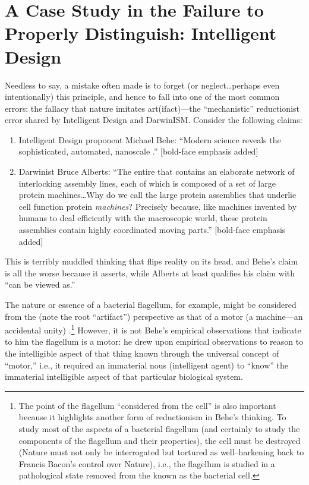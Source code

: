 \section{A Case Study in the Failure to Properly Distinguish: Intelligent Design}

Needless to say, a mistake often made is to forget (or neglect\ldots perhaps even intentionally) this principle, and hence to fall into one of the most common errors: the fallacy that nature imitates art(ifact)---the ``mechanistic'' reductionist error shared by Intelligent Design and DarwinISM. Consider the following claims:

\begin{enumerate}
\item Intelligent Design proponent Michael Behe: ``Modern science reveals the  sophisticated, automated, nanoscale .''\cite{beheinterview} [bold-face emphasis added]
\item Darwinist Bruce Alberts: ``The entire  that contains an elaborate network of interlocking assembly lines, each of which is composed of a set of large protein machines\ldots Why do we call the large protein assemblies that underlie cell function protein \emph{machines}? Precisely because, like machines invented by humans to deal efficiently with the macroscopic world, these protein assemblies contain highly coordinated moving parts.''\cite{balberts} [bold-face emphasis added]
\end{enumerate}

This is terribly muddled thinking that flips reality on its head, and Behe's claim is all the worse because it asserts, while Alberts at least qualifies his claim with ``can be viewed as.''

The nature or essence of a bacterial flagellum, for example, might be considered from the  (note the root ``artifact'') perspective as that of a motor (a machine---an accidental unity) .\footnote{The point of the flagellum ``considered  from the cell'' is also important because it highlights another form of reductionism in Behe's thinking. To study most of the aspects of a bacterial flagellum (and certainly to study the components of the flagellum and their properties), the cell must be destroyed (Nature must not only be interrogated but tortured as well--harkening back to Francis Bacon's  control over Nature), i.e., the flagellum is studied in a pathological state removed from the  known as the bacterial cell.} However, it is not Behe's empirical observations that indicate to him the flagellum is a motor: he drew upon empirical observations to reason to the intelligible aspect of that thing known through the universal concept of ``motor,'' i.e., it required an immaterial nous (intelligent agent) to ``know'' the immaterial intelligible aspect of that particular biological system.

